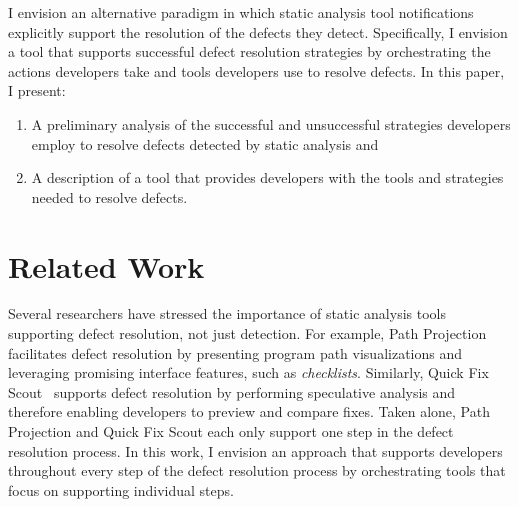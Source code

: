 \documentclass{sig-alternate}
\newcommand{\compresslist}{
	\vspace{-.5em}
	\setlength{\itemsep}{1pt}
	\setlength{\parskip}{0pt}
	\setlength{\parsep}{0pt}
}
\begin{document}
I envision an alternative paradigm in which static analysis tool notifications explicitly support the resolution of the defects they detect. 
Specifically, I envision a tool that supports successful defect resolution strategies by orchestrating the actions developers take and tools developers use to resolve defects.
In this paper, I present: 
\begin{enumerate}
	\compresslist
	\item A preliminary analysis of the successful and unsuccessful strategies developers employ to resolve defects detected by static analysis and 	
	\item A description of a tool that provides developers with the tools and strategies needed to resolve defects.
	
\end{enumerate}


\section{Related Work}
\label{sec:rw}
Several researchers have stressed the importance of static analysis tools supporting defect resolution, not just detection.
For example, Path Projection~\cite{Khoo2008} facilitates defect resolution by presenting program path visualizations and leveraging promising interface features, such as \textit{checklists}. 
Similarly, Quick Fix Scout~\cite{Muslu2012} supports defect resolution by performing speculative analysis and therefore enabling developers to preview and compare fixes.
Taken alone, Path Projection and Quick Fix Scout each only support one step in the defect resolution process.
In this work, I envision an approach that supports developers throughout every step of the defect resolution process by orchestrating tools that focus on supporting individual steps.
\end{document}
